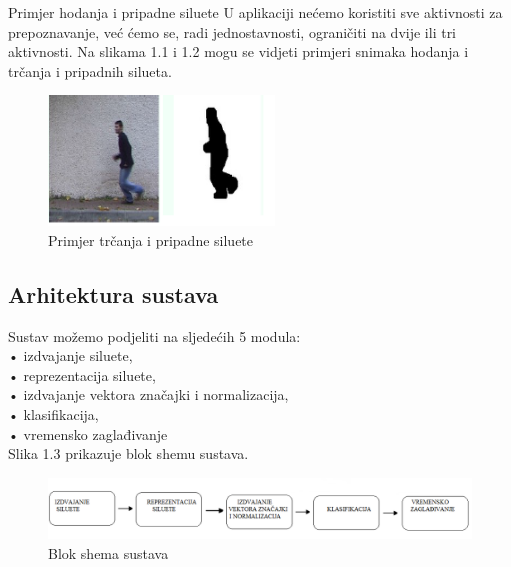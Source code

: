 \documentclass[times, utf8, diplomski]{fer}
\begin{document}
Primjer hodanja i pripadne siluete
U aplikaciji nećemo koristiti sve aktivnosti za prepoznavanje, već ćemo se, radi
jednostavnosti, ograničiti na dvije ili tri aktivnosti. Na slikama 1.1 i 1.2 mogu se vidjeti
primjeri snimaka hodanja i trčanja i pripadnih silueta.
\newline
\begin{figure}[ht!]
\centering
\includegraphics[width=60mm]{run.png}
\caption{ Primjer trčanja i pripadne siluete \label{overflow}}
\end{figure}


\subsection{Arhitektura sustava}

Sustav možemo podjeliti na sljedećih 5 modula: \\
• izdvajanje siluete, \\
• reprezentacija siluete, \\
• izdvajanje vektora značajki i normalizacija, \\
• klasifikacija, \\
• vremensko zaglađivanje \\
Slika 1.3 prikazuje blok shemu sustava.
\newline
\begin{figure}[ht!]
\centering
\includegraphics[width=170mm]{arhitektura.png}
\caption{ Blok shema sustava \label{overflow}}
\end{figure}
\end{document}
